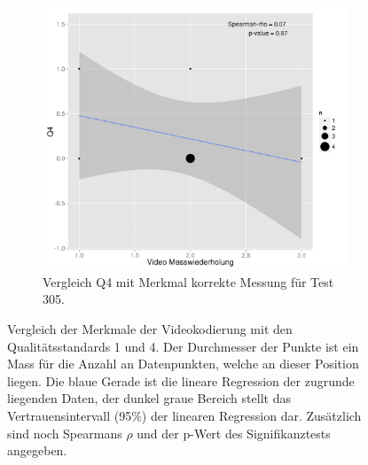 \begin{figure}[htp]
\begin{subfigure}{0.32\textwidth}
       \label{fig:corVideoQ4301}
     \end{subfigure}
      \begin{subfigure}{0.32\textwidth}
         \includegraphics[width=1.0\linewidth]{graphics/corVideoQ4305.png}
       \caption{Vergleich Q4 mit Merkmal korrekte Messung für Test 305.}
       \label{fig:corVideoQ4305}
       \end{subfigure}
  
  \caption{Vergleich der Merkmale der Videokodierung mit den Qualitätsstandards 1 und 4. Der Durchmesser der Punkte ist ein Mass für die Anzahl an Datenpunkten, welche an dieser Position liegen. Die blaue Gerade ist die lineare Regression der zugrunde liegenden Daten, der dunkel graue Bereich stellt das Vertrauensintervall (95\%) der linearen Regression dar. Zusätzlich sind noch Spearmans $\rho$ und der p-Wert des Signifikanztests angegeben.}
  \label{fig:corVideoQ}
  \end{figure}
 
